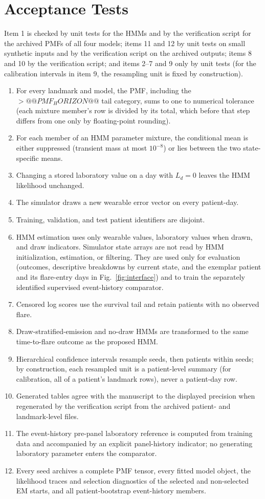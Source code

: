 \documentclass{ieeeaccess}
\begin{document}
\section{\texorpdfstring{\break}{}Acceptance Tests}\label{app:tests}
Item 1 is checked by unit tests for the HMMs and by the verification script for the archived PMFs of all four models; items 11 and 12 by unit tests on small synthetic inputs and by the verification script on the archived outputs; items 8 and 10 by the verification script; and items 2--7 and 9 only by unit tests (for the calibration intervals in item 9, the resampling unit is fixed by construction).
\begin{enumerate}
\item For every landmark and model, the PMF, including the ${>}@@PMF_HORIZON@@$ tail category, sums to one to numerical tolerance (each mixture member's row is divided by its total, which before that step differs from one only by floating-point rounding).
\item For each member of an HMM parameter mixture, the conditional mean is either suppressed (transient mass at most $10^{-8}$) or lies between the two state-specific means.
\item Changing a stored laboratory value on a day with $L_d=0$ leaves the HMM likelihood unchanged.
\item The simulator draws a new wearable error vector on every patient-day.
\item Training, validation, and test patient identifiers are disjoint.
\item HMM estimation uses only wearable values, laboratory values when drawn, and draw indicators. Simulator state arrays are not read by HMM initialization, estimation, or filtering. They are used only for evaluation (outcomes, descriptive breakdowns by current state, and the exemplar patient and its flare-entry days in Fig.~\ref{fig:interface}) and to train the separately identified supervised event-history comparator.
\item Censored log scores use the survival tail and retain patients with no observed flare.
\item Draw-stratified-emission and no-draw HMMs are transformed to the same time-to-flare outcome as the proposed HMM.
\item Hierarchical confidence intervals resample seeds, then patients within seeds; by construction, each resampled unit is a patient-level summary (for calibration, all of a patient's landmark rows), never a patient-day row.
\item Generated tables agree with the manuscript to the displayed precision when regenerated by the verification script from the archived patient- and landmark-level files.
\item The event-history pre-panel laboratory reference is computed from training data and accompanied by an explicit panel-history indicator; no generating laboratory parameter enters the comparator.
\item Every seed archives a complete PMF tensor, every fitted model object, the likelihood traces and selection diagnostics of the selected and non-selected EM starts, and all patient-bootstrap event-history members.
\end{enumerate}
\end{document}
